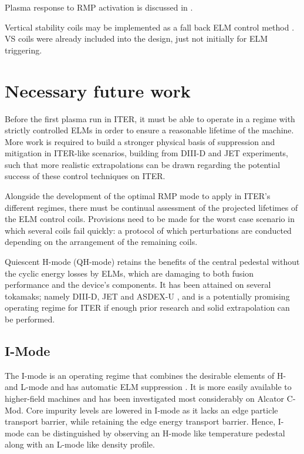 \documentclass[12pt]{article}  %
\begin{document}
Plasma response to RMP activation is discussed in \cite{Waelbroeck2009}.



Vertical stability coils may be implemented as a fall back ELM control method \cite{Loarte2014a}. VS coils were already included into the design, just not initially for ELM triggering.

\section{Necessary future work}\label{sec:Future}
Before the first plasma run in ITER, it must be able to operate in a regime with strictly controlled ELMs in order to ensure a reasonable lifetime of the machine. More work is required to build a stronger physical basis of suppression and mitigation in ITER-like scenarios, building from DIII-D \cite{Evans2008,Lanctot2013} and JET \cite{Liang2013} experiments, such that more realistic extrapolations can be drawn regarding the potential success of these control techniques on ITER.

Alongside the development of the optimal RMP mode to apply in ITER's different regimes, there must be continual assessment of the projected lifetimes of the ELM control coils. Provisions need to be made for the worst case scenario in which several coils fail quickly: a protocol of which perturbations are conducted depending on the arrangement of the remaining coils. 

Quiescent H-mode (QH-mode) retains the benefits of the central pedestal without the cyclic energy losses by ELMs, which are damaging to both fusion performance and the device's components. It has been attained on several tokamaks; namely DIII-D, JET and ASDEX-U \cite{Burrell2002, Suttrop2005}, and is a potentially promising operating regime for ITER if enough prior research and solid extrapolation can be performed.


\subsection{I-Mode}
The I-mode is an operating regime that combines the desirable elements of H- and L-mode \cite{Whyte2010} and has automatic ELM suppression \cite{Marmar2015}. It is more easily available to higher-field machines and has been investigated most considerably on Alcator C-Mod. Core impurity levels are lowered in I-mode as it lacks an edge particle transport barrier, while retaining the edge energy transport barrier. Hence, I-mode can be distinguished by observing an H-mode like temperature pedestal along with an L-mode like density profile.\cite{Whyte2010}




\printbibliography
\end{document}
